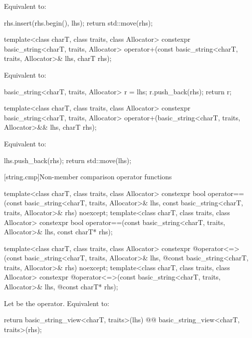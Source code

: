 \begin{itemdescr}
\pnum
\effects
Equivalent to:
\begin{codeblock}
rhs.insert(rhs.begin(), lhs);
return std::move(rhs);
\end{codeblock}
\end{itemdescr}

%
\begin{itemdecl}
template<class charT, class traits, class Allocator>
  constexpr basic_string<charT, traits, Allocator>
    operator+(const basic_string<charT, traits, Allocator>& lhs, charT rhs);
\end{itemdecl}

\begin{itemdescr}
\pnum
\effects
Equivalent to:
\begin{codeblock}
basic_string<charT, traits, Allocator> r = lhs;
r.push_back(rhs);
return r;
\end{codeblock}
\end{itemdescr}

%
\begin{itemdecl}
template<class charT, class traits, class Allocator>
  constexpr basic_string<charT, traits, Allocator>
    operator+(basic_string<charT, traits, Allocator>&& lhs, charT rhs);
\end{itemdecl}

\begin{itemdescr}
\pnum
\effects
Equivalent to:
\begin{codeblock}
lhs.push_back(rhs);
return std::move(lhs);
\end{codeblock}
\end{itemdescr}

[string.cmp]{Non-member comparison operator functions}
\begin{itemdecl}
template<class charT, class traits, class Allocator>
  constexpr bool
    operator==(const basic_string<charT, traits, Allocator>& lhs,
               const basic_string<charT, traits, Allocator>& rhs) noexcept;
template<class charT, class traits, class Allocator>
  constexpr bool operator==(const basic_string<charT, traits, Allocator>& lhs,
                            const charT* rhs);

template<class charT, class traits, class Allocator>
  constexpr @\seebelow@ operator<=>(const basic_string<charT, traits, Allocator>& lhs,
            @\itcorr@                      const basic_string<charT, traits, Allocator>& rhs) noexcept;
template<class charT, class traits, class Allocator>
  constexpr @\seebelow@ operator<=>(const basic_string<charT, traits, Allocator>& lhs,
            @\itcorr@                      const charT* rhs);
\end{itemdecl}
\begin{itemdescr}
\pnum
\effects
Let  be the operator.
Equivalent to:
\begin{codeblock}
return basic_string_view<charT, traits>(lhs) @@ basic_string_view<charT, traits>(rhs);
\end{codeblock}
\end{itemdescr}

